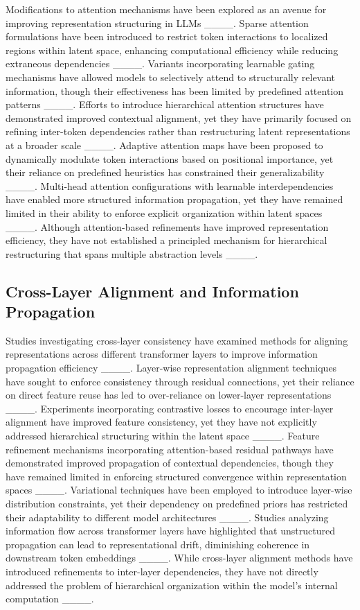 Modifications to attention mechanisms have been explored as an avenue for improving representation structuring in LLMs ____. Sparse attention formulations have been introduced to restrict token interactions to localized regions within latent space, enhancing computational efficiency while reducing extraneous dependencies ____. Variants incorporating learnable gating mechanisms have allowed models to selectively attend to structurally relevant information, though their effectiveness has been limited by predefined attention patterns ____. Efforts to introduce hierarchical attention structures have demonstrated improved contextual alignment, yet they have primarily focused on refining inter-token dependencies rather than restructuring latent representations at a broader scale ____. Adaptive attention maps have been proposed to dynamically modulate token interactions based on positional importance, yet their reliance on predefined heuristics has constrained their generalizability ____. Multi-head attention configurations with learnable interdependencies have enabled more structured information propagation, yet they have remained limited in their ability to enforce explicit organization within latent spaces ____. Although attention-based refinements have improved representation efficiency, they have not established a principled mechanism for hierarchical restructuring that spans multiple abstraction levels ____.

\subsection{Cross-Layer Alignment and Information Propagation}

Studies investigating cross-layer consistency have examined methods for aligning representations across different transformer layers to improve information propagation efficiency ____. Layer-wise representation alignment techniques have sought to enforce consistency through residual connections, yet their reliance on direct feature reuse has led to over-reliance on lower-layer representations ____. Experiments incorporating contrastive losses to encourage inter-layer alignment have improved feature consistency, yet they have not explicitly addressed hierarchical structuring within the latent space ____. Feature refinement mechanisms incorporating attention-based residual pathways have demonstrated improved propagation of contextual dependencies, though they have remained limited in enforcing structured convergence within representation spaces ____. Variational techniques have been employed to introduce layer-wise distribution constraints, yet their dependency on predefined priors has restricted their adaptability to different model architectures ____. Studies analyzing information flow across transformer layers have highlighted that unstructured propagation can lead to representational drift, diminishing coherence in downstream token embeddings ____. While cross-layer alignment methods have introduced refinements to inter-layer dependencies, they have not directly addressed the problem of hierarchical organization within the model’s internal computation ____.